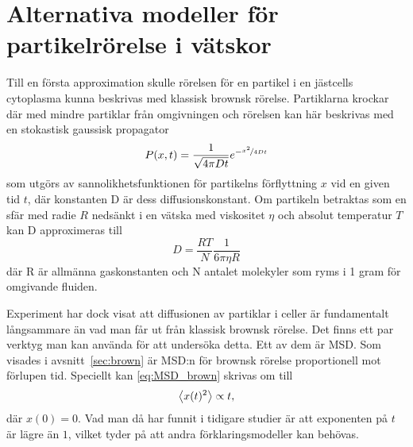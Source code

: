 \section{Alternativa modeller för partikelrörelse i vätskor}

Till en första approximation skulle rörelsen för en partikel i en jästcells cytoplasma kunna beskrivas med klassisk brownsk rörelse. Partiklarna krockar där med mindre partiklar från omgivningen och rörelsen kan här beskrivas med en stokastisk gaussisk propagator~\cite{Einstein1905}
\begin{equation}
P(x,t)=\frac{1}{\sqrt{4\pi Dt}}e^{-\nicefrac{x^2}{4Dt}}
\end{equation} %
som utgörs av sannolikhetsfunktionen för partikelns förflyttning $x$ vid en given tid $t$, där konstanten D är dess diffusionskonstant. Om partikeln betraktas som en sfär med radie $R$ nedsänkt i en vätska med viskositet $\eta$ och absolut temperatur $T$ kan D approximeras till~\cite{Einstein1905}
\begin{equation}
D=\frac{RT}{N}\frac{1}{6\pi \eta R}
\end{equation}
där R är allmänna gaskonstanten och N antalet molekyler som ryms i 1 gram för omgivande fluiden.

Experiment\cite{Midtveldt_etal2016} har dock visat att diffusionen av partiklar i celler är fundamentalt långsammare än vad man får ut från klassisk brownsk rörelse. Det finns ett par verktyg man kan använda för att undersöka detta. Ett av dem är MSD. Som visades i avsnitt~\ref{sec:brown} är MSD:n för brownsk rörelse proportionell mot förlupen tid. Speciellt kan \eqref{eq:MSD_brown} skrivas om till
\begin{equation}
\ev{x(t)^2} \propto t,
\end{equation}
där $x(0)=0$. Vad man\cite{Midtveldt_etal2016} då har funnit i tidigare studier är att exponenten på $t$ är lägre än $1$, vilket tyder på att andra förklaringsmodeller kan behövas. %



